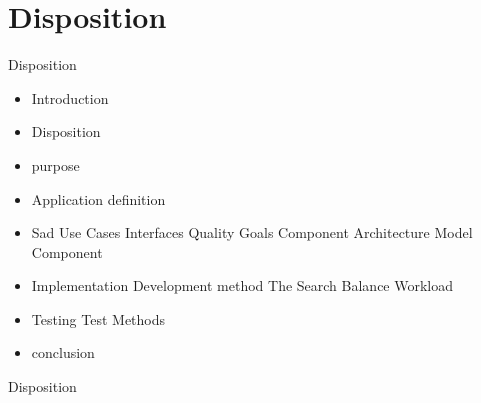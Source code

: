 \section*{Disposition}
\begin{frame}{Disposition}
\begin{itemize}
	\item Introduction
	\item Disposition
	\item purpose
	\item Application definition
	\item Sad
	\subitem Use Cases
	\subitem Interfaces
	\subitem Quality Goals
	\subitem Component Architecture
	\subitem Model Component
	\item Implementation
	\subitem Development method
	\subitem The Search
	\subitem Balance Workload
	\item Testing
	\subitem Test Methods
	\subitem 
	\subitem
	\item conclusion
\end{itemize}

Disposition


\end{frame}